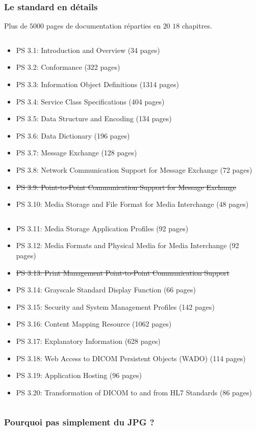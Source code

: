 	\frame
	{
		\frametitle{Le standard en d\'etails}
		Plus de $5000$ pages de documentation r\'eparties en \st{$20$} $18$ chapitres.
		
		\begin{columns}\begin{scriptsize}
	  	\begin{column}[t]{0.5\linewidth}
			\begin{itemize}
				\item PS 3.1: Introduction and Overview (34 pages)
				\item PS 3.2: Conformance (322 pages)
				\item PS 3.3: Information Object Definitions (1314 pages)
				\item PS 3.4: Service Class Specifications (404 pages)
				\item PS 3.5: Data Structure and Encoding (134 pages)
				\item PS 3.6: Data Dictionary (196 pages)
				\item PS 3.7: Message Exchange (128 pages)
				\item PS 3.8: Network Communication Support for Message Exchange (72 pages)
				\item \st{PS 3.9: Point-to-Point Communication Support for Message Exchange}
				\item PS 3.10: Media Storage and File Format for Media Interchange (48 pages)
			\end{itemize}
	  	\end{column}
	  	\begin{column}[t]{0.5\linewidth}
			\begin{itemize}
				\item PS 3.11: Media Storage Application Profiles (92 pages)
				\item PS 3.12: Media Formats and Physical Media for Media Interchange (92 pages)
				\item \st{PS 3.13: Print Management Point-to-Point Communication Support}
				\item PS 3.14: Grayscale Standard Display Function (66 pages)
				\item PS 3.15: Security and System Management Profiles (142 pages)
				\item PS 3.16: Content Mapping Resource (1062 pages)
				\item PS 3.17: Explanatory Information (628 pages)
				\item PS 3.18: Web Access to DICOM Persistent Objects (WADO) (114 pages)
				\item PS 3.19: Application Hosting (96 pages)
				\item PS 3.20: Transformation of DICOM to and from HL7 Standards (86 pages)
			\end{itemize}
	  	\end{column}\end{scriptsize}
	  	\end{columns}
	}

	\frame
	{
		\frametitle{Pourquoi pas simplement du JPG ?}
		
		
	}